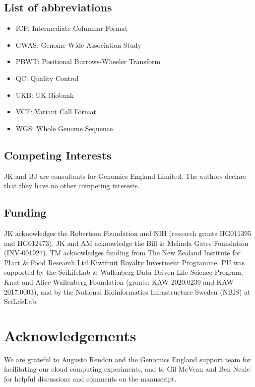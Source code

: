 \documentclass[a4paper,num-refs]{oup-contemporary}
\begin{document}
\subsection{List of abbreviations}

\begin{itemize}
    \item ICF: Intermediate Columnar Format
    \item GWAS: Genome Wide Association Study
    \item PBWT: Positional Burrows-Wheeler Transform
    \item QC: Quality Control
    \item UKB: UK Biobank
    \item VCF: Variant Call Format
    \item WGS: Whole Genome Sequence
\end{itemize}

\subsection{Competing Interests}
JK and BJ are consultants for Genomics England Limited.
The authors declare that they have no other competing interests.

\subsection{Funding}
JK acknowledges the Robertson Foundation and
NIH (research grants HG011395 and HG012473).
JK and AM acknowledge the Bill \& Melinda Gates Foundation (INV-001927).
TM acknowledges funding from The New Zealand Institute for Plant \& Food
Research Ltd Kiwifruit Royalty Investment Programme.
PU was supported by the SciLifeLab \& Wallenberg Data Driven Life
Science Program, Knut and Alice Wallenberg Foundation (grants: KAW
2020.0239 and KAW 2017.0003), and by the National Bioinformatics
Infrastructure Sweden (NBIS) at SciLifeLab

\section{Acknowledgements}
We are grateful to Augusto Rendon and the Genomics 
England support team for facilitating our cloud computing experiments,
and to Gil McVean and Ben Neale for helpful discussions and comments on the 
manuscript.
\end{document}
